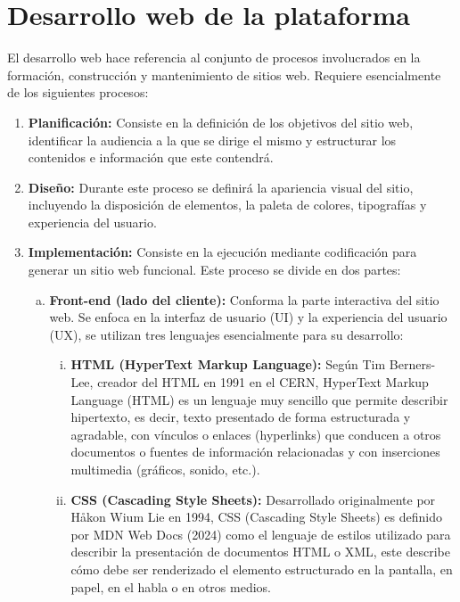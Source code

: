 \documentclass[12pt,a4paper]{report}
\begin{document}
\section{Desarrollo web de la plataforma}

El desarrollo web hace referencia al conjunto de procesos involucrados en la formación, construcción y mantenimiento de sitios web. Requiere esencialmente de los siguientes procesos:

\begin{enumerate}
\item \textbf{Planificación:} Consiste en la definición de los objetivos del sitio web, identificar la audiencia a la que se dirige el mismo y estructurar los contenidos e información que este contendrá.

\item \textbf{Diseño:} Durante este proceso se definirá la apariencia visual del sitio, incluyendo la disposición de elementos, la paleta de colores, tipografías y experiencia del usuario.

\item \textbf{Implementación:} Consiste en la ejecución mediante codificación para generar un sitio web funcional. Este proceso se divide en dos partes:
\begin{enumerate}[a.]
\item \textbf{Front-end (lado del cliente):} Conforma la parte interactiva del sitio web. Se enfoca en la interfaz de usuario (UI) y la experiencia del usuario (UX), se utilizan tres lenguajes esencialmente para su desarrollo:
\begin{enumerate}[i.]
\item \textbf{HTML (HyperText Markup Language):} Según Tim Berners-Lee, creador del HTML en 1991 en el CERN, HyperText Markup Language (HTML) es un lenguaje muy sencillo que permite describir hipertexto, es decir, texto presentado de forma estructurada y agradable, con vínculos o enlaces (hyperlinks) que conducen a otros documentos o fuentes de información relacionadas y con inserciones multimedia (gráficos, sonido, etc.).

\item \textbf{CSS (Cascading Style Sheets):} Desarrollado originalmente por Håkon Wium Lie en 1994, CSS (Cascading Style Sheets) es definido por MDN Web Docs (2024) como el lenguaje de estilos utilizado para describir la presentación de documentos HTML o XML, este describe cómo debe ser renderizado el elemento estructurado en la pantalla, en papel, en el habla o en otros medios.


\end{enumerate}
\end{enumerate}
\end{enumerate}
\end{document}
